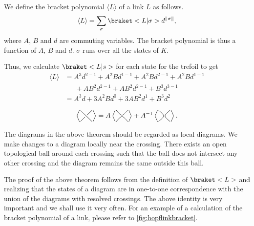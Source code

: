 We define the bracket polynomial \(\langle L\rangle\) of a link \(L\) as follows. \[\langle L \rangle = \sum_\sigma\braket<L|\sigma> d^{\norm{\sigma}},\] where \(A\), \(B\) and \(d\) are commuting variables. The bracket polynomial is thus a function of \(A\), \(B\) and \(d\). \(\sigma\) runs over all the states of \(K\).

Thus, we calculate \(\braket<L|s>\) for each state for the trefoil to get
\begin{align*}
    \langle L\rangle &= A^3d^{2-1} + A^2Bd^{1-1} + A^2Bd^{2-1} + A^2Bd^{1-1}\\
					 &\phantom{=\,} + AB^2d^{2-1} + AB^2d^{2-1} + B^3d^{3-1}\\
	                 &= A^3d + 3A^2Bd^0 + 3AB^2d^1 + B^3d^2
\end{align*}

\begin{thm}
    \[\BB = A\BD + A^{-1}\BE.\]
\end{thm}

The diagrams in the above theorem should be regarded as local diagrams. We make changes to a diagram locally near the crossing. There exists an open topological ball around each crossing such that the ball does not intersect any other crossing and the diagram remains the same outside this ball.

The proof of the above theorem follows from the definition of \(\braket<L>\) and realizing that the states of a diagram are in one-to-one correspondence with the union of the diagrams with resolved crossings. The above identity is very important and we shall use it very often. For an example of a calculation of the bracket polynomial of a link, please refer to \cref{fig:hopflinkbracket}.

% 	

